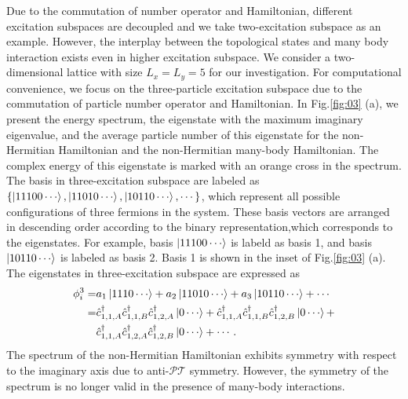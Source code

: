 \documentclass[longbibliography, aps, prx, amsmath, amssymb, amsfonts, twocolumn,superscriptaddress, footinbib]{revtex4-1}
\begin{document}
	Due to the commutation of number operator and Hamiltonian, different excitation subspaces are decoupled and we take two-excitation subspace as an example. However, the interplay between the topological states and many body interaction exists even in higher excitation subspace.
	We consider a two-dimensional lattice with size $L_x = L_y = 5$ for our investigation. For computational convenience, we focus on the three-particle excitation subspace due to the commutation of particle number operator and Hamiltonian. 
	In Fig.\ref{fig:03} (a), we present the energy spectrum, the eigenstate with the maximum imaginary eigenvalue, and the average particle number of this eigenstate for the non-Hermitian Hamiltonian and the non-Hermitian many-body Hamiltonian. 
	The complex energy of this eigenstate is marked with an orange cross in the spectrum. 
	The basis in three-excitation subspace are labeled as $\{\ket{11100\cdots}, \ket{11010\cdots}, \ket{10110\cdots},\cdots\}$, which represent all possible configurations of three fermions in the system. These basis vectors are arranged in descending order according to the binary representation,which corresponds to the eigenstates. For example, basis $\ket{11100\cdots}$ is labeld as basis 1, and basis $\ket{10110\cdots}$ is labeled as basis 2. Basis 1 is shown in the inset of Fig.\ref{fig:03} (a). 
	The eigenstates in three-excitation subspace are expressed as 
	\begin{equation}
		\begin{split}
			\phi_i^3 =& a_1 \ket{1110\cdots} + a_2 \ket{11010\cdots} + a_3 \ket{10110\cdots} + \cdots\\
			=& \hat{c}_{1,1,A}^{\dagger}\hat{c}_{1,1,B}^{\dagger}\hat{c}_{1,2,A}^{\dagger} \ket{0\cdots} + \hat{c}_{1,1,A}^{\dagger}\hat{c}_{1,1,B}^{\dagger}\hat{c}_{1,2,B}^{\dagger} \ket{0\cdots} + \\
			&\hat{c}_{1,1,A}^{\dagger}\hat{c}_{1,2,A}^{\dagger}\hat{c}_{1,2,B}^{\dagger} \ket{0\cdots} + \cdots.
		\end{split}
	\end{equation}
	The spectrum of the non-Hermitian Hamiltonian exhibits symmetry with respect to the imaginary axis due to anti-$\mathcal{PT}$ symmetry. However, the symmetry of the spectrum is no longer valid in the presence of many-body interactions. 
\end{document}
